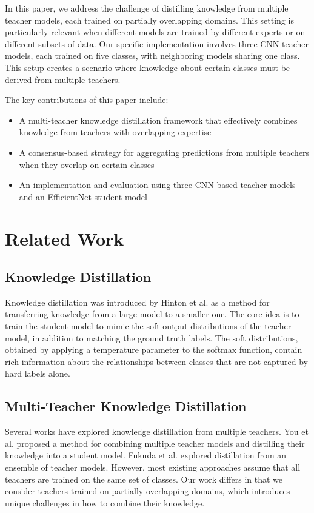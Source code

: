 \documentclass[conference]{IEEEtran}
\begin{document}
In this paper, we address the challenge of distilling knowledge from multiple teacher models, each trained on partially overlapping domains. This setting is particularly relevant when different models are trained by different experts or on different subsets of data. Our specific implementation involves three CNN teacher models, each trained on five classes, with neighboring models sharing one class. This setup creates a scenario where knowledge about certain classes must be derived from multiple teachers.

The key contributions of this paper include:
\begin{itemize}
    \item A multi-teacher knowledge distillation framework that effectively combines knowledge from teachers with overlapping expertise
    \item A consensus-based strategy for aggregating predictions from multiple teachers when they overlap on certain classes
    \item An implementation and evaluation using three CNN-based teacher models and an EfficientNet student model
\end{itemize}

\section{Related Work}
\subsection{Knowledge Distillation}
Knowledge distillation was introduced by Hinton et al. \cite{hinton2015distilling} as a method for transferring knowledge from a large model to a smaller one. The core idea is to train the student model to mimic the soft output distributions of the teacher model, in addition to matching the ground truth labels. The soft distributions, obtained by applying a temperature parameter to the softmax function, contain rich information about the relationships between classes that are not captured by hard labels alone.

\subsection{Multi-Teacher Knowledge Distillation}
Several works have explored knowledge distillation from multiple teachers. You et al. \cite{you2017learning} proposed a method for combining multiple teacher models and distilling their knowledge into a student model. Fukuda et al. \cite{fukuda2017efficient} explored distillation from an ensemble of teacher models. However, most existing approaches assume that all teachers are trained on the same set of classes. Our work differs in that we consider teachers trained on partially overlapping domains, which introduces unique challenges in how to combine their knowledge.
\end{document}
